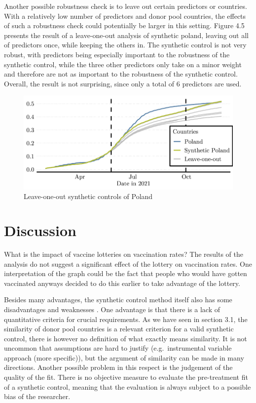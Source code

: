 \documentclass{scrbook}
\begin{document}
Another possible robustness check is to leave out certain predictors or
countries. With a relatively low number of predictors and donor pool
countries, the effects of such a robustness check could potentially be
larger in this setting. Figure 4.5 presents the result of a
leave-one-out analysis of synthetic poland, leaving out all of
predictors once, while keeping the others in. The synthetic control is
not very robust, with predictors being especially important to the
robustness of the synthetic control, while the three other predictors
only take on a minor weight and therefore are not as important to the
robustness of the synthetic control. Overall, the result is not
surprising, since only a total of 6 predictors are used.

\begin{figure}[h]
\caption{Leave-one-out synthetic controls of Poland}

\begin{center}\includegraphics{bachelor_thesis_files/figure-latex/unnamed-chunk-6-1} \end{center}
\end{figure}

\chapter{Discussion}

What is the impact of vaccine lotteries on vaccination rates? The
results of the analysis do not suggest a significant effect of the
lottery on vaccination rates. One interpretation of the graph could be
the fact that people who would have gotten vaccinated anyways decided to
do this earlier to take advantage of the lottery.

Besides many advantages, the synthetic control method itself also has
some disadvantages and weaknesses \parencite{bouttell_synthetic_2018}.
One advantage is that there is a lack of quantitative criteria for
crucial requirements. As we have seen in section 3.1, the similarity of
donor pool countries is a relevant criterion for a valid synthetic
control, there is however no definition of what exactly means
similarity. It is not uncommon that assumptions are hard to justify
(e.g.~instrumental variable approach (more specific)), but the argument
of similarity can be made in many directions. Another possible problem
in this respect is the judgement of the quality of the fit. There is no
objective measure to evaluate the pre-treatment fit of a synthetic
control, meaning that the evaluation is always subject to a possible
bias of the researcher.
\end{document}
